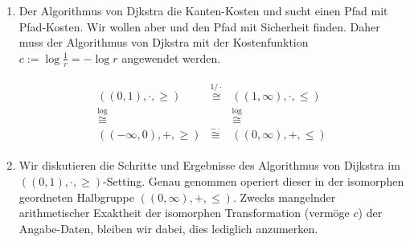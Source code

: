 \begin{solution}

\begin{enumerate}[label = \alph*]

    \item \phantom{}
    
    
    Der Algorithmus von Djkstra  die Kanten-Kosten und sucht einen Pfad mit  Pfad-Kosten.
    Wir wollen aber  und den Pfad mit  Sicherheit finden.
    Daher muss der Algorithmus von Djkstra mit der Kostenfunktion $c := \log \frac{1}{r} = -\log r$ angewendet werden.

    \begin{align*}
        \begin{matrix}
            ((0, 1), \cdot, \geq)   & \stackrel{1 / \cdot}{\cong} & ((1, \infty), \cdot, \leq) \\
            \stackrel{\log}{\cong}  &                             & \stackrel{\log}{\cong}     \\
            ((-\infty, 0), +, \geq) & \stackrel{- \cdot}{\cong}   & ((0, \infty), +, \leq)
        \end{matrix}
    \end{align*}

    \item Wir diskutieren die Schritte und Ergebnisse des Algorithmus von Dijkstra im $((0, 1), \cdot, \geq)$-Setting.
    Genau genommen operiert dieser in der isomorphen geordneten Halbgruppe $((0, \infty), +, \leq)$.
    Zwecks mangelnder arithmetischer Exaktheit der isomorphen Transformation (vermöge $c$) der Angabe-Daten, bleiben wir dabei, dies lediglich anzumerken.

\end{enumerate}    

\begin{center}

\end{center}
\end{solution}
